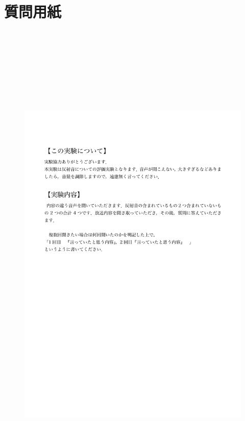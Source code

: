 \documentclass[a4j,11pt]{jsarticle}
\begin{document}
\section{質問用紙}
\begin{figure}[h]
\begin{center}
 \includegraphics[clip,width=180mm,height=240mm]{shitsumonshi1.pdf}
\end{center}
 \label{fig:kaitourei2}
\end{figure}
\end{document}
